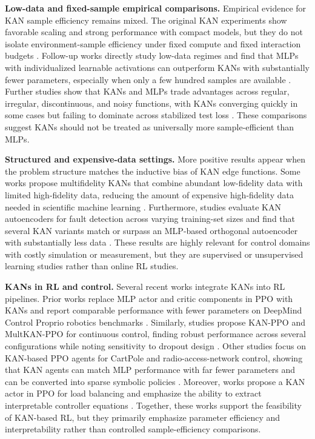 \documentclass{article}
\begin{document}
\textbf{Low-data and fixed-sample empirical comparisons.}
Empirical evidence for KAN sample efficiency remains mixed.
The original KAN experiments show favorable scaling and strong performance with compact models, but they do not isolate environment-sample efficiency under fixed compute and fixed interaction budgets \cite{liu2024kan}.
Follow-up works directly study low-data regimes and find that MLPs with individualized learnable activations can outperform KANs with substantially fewer parameters, especially when only a few hundred samples are available \cite{pourkamali2025lowdata}.
Further studies show that KANs and MLPs trade advantages across regular, irregular, discontinuous, and noisy functions, with KANs converging quickly in some cases but failing to dominate across stabilized test loss \cite{zeng2024irregular}.
These comparisons suggest KANs should not be treated as universally more sample-efficient than MLPs.

\textbf{Structured and expensive-data settings.}
More positive results appear when the problem structure matches the inductive bias of KAN edge functions.
Some works propose multifidelity KANs that combine abundant low-fidelity data with limited high-fidelity data, reducing the amount of expensive high-fidelity data needed in scientific machine learning \cite{howard2024multifidelity}.
Furthermore, studies evaluate KAN autoencoders for fault detection across varying training-set sizes and find that several KAN variants match or surpass an MLP-based orthogonal autoencoder with substantially less data \cite{villagomez2025kanae}.
These results are highly relevant for control domains with costly simulation or measurement, but they are supervised or unsupervised learning studies rather than online RL studies.

\textbf{KANs in RL and control.}
Several recent works integrate KANs into RL pipelines.
Prior works replace MLP actor and critic components in PPO with KANs and report comparable performance with fewer parameters on DeepMind Control Proprio robotics benchmarks \cite{kich2024online}.
Similarly, studies propose KAN-PPO and MultKAN-PPO for continuous control, finding robust performance across several configurations while noting sensitivity to dropout design \cite{bayeh2026kanppo}.
Other studies focus on KAN-based PPO agents for CartPole and radio-access-network control, showing that KAN agents can match MLP performance with far fewer parameters and can be converted into sparse symbolic policies \cite{dalto2025explainable}.
Moreover, works propose a KAN actor in PPO for load balancing and emphasize the ability to extract interpretable controller equations \cite{singh2026loadbalancing}.
Together, these works support the feasibility of KAN-based RL, but they primarily emphasize parameter efficiency and interpretability rather than controlled sample-efficiency comparisons.
\end{document}
